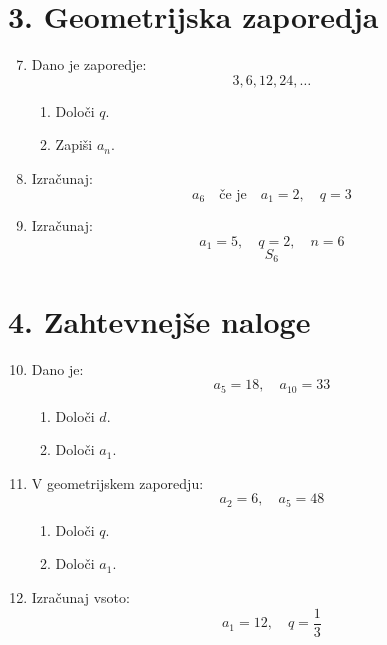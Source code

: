 \documentclass[a4paper,12pt]{article}
\begin{document}
\section*{3. Geometrijska zaporedja}

\begin{enumerate}
\setcounter{enumi}{6}

\item Dano je zaporedje:
\[
3, 6, 12, 24, \dots
\]

\begin{enumerate}
\item Določi \( q \).
\vspace{1.5cm}
\item Zapiši \( a_n \).
\vspace{1.5cm}
\end{enumerate}

\item Izračunaj:
\[
a_6 \quad \text{če je} \quad a_1 = 2, \quad q = 3
\]
\vspace{2cm}

\item Izračunaj:
\[
a_1 = 5, \quad q = 2, \quad n = 6
\]
\[
S_6
\]
\vspace{2cm}

\end{enumerate}

\section*{4. Zahtevnejše naloge}

\begin{enumerate}
\setcounter{enumi}{9}

\item Dano je:
\[
a_5 = 18, \quad a_{10} = 33
\]

\begin{enumerate}
\item Določi \( d \).
\vspace{1.5cm}
\item Določi \( a_1 \).
\vspace{1.5cm}
\end{enumerate}

\item V geometrijskem zaporedju:
\[
a_2 = 6, \quad a_5 = 48
\]

\begin{enumerate}
\item Določi \( q \).
\vspace{1.5cm}
\item Določi \( a_1 \).
\vspace{1.5cm}
\end{enumerate}

\item Izračunaj vsoto:
\[
a_1 = 12, \quad q = \frac{1}{3}
\]
\vspace{2cm}

\end{enumerate}
\end{document}
